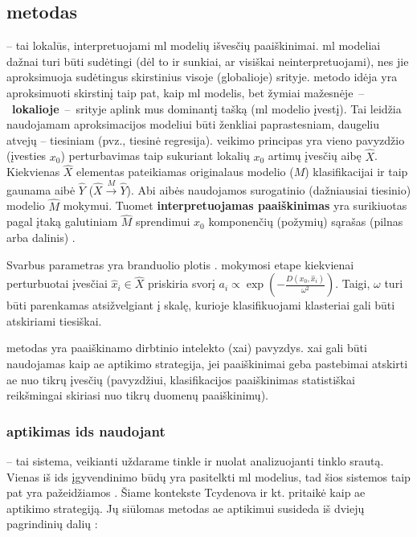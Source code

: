 \subsection{\LIME metodas}\label{sec:literature:lime}

\LIME {} -- tai lokalūs, interpretuojami \gls{ml} modelių išvesčių paaiškinimai. \gls{ml} modeliai dažnai turi būti sudėtingi (dėl to ir sunkiai, ar visiškai neinterpretuojami), nes jie aproksimuoja sudėtingus skirstinius visoje (globalioje) srityje. \LIME metodo idėja yra aproksimuoti skirstinį taip pat, kaip \gls{ml} modelis, bet žymiai mažesnėje~--~\textbf{lokalioje}~--~srityje  aplink mus dominantį tašką (\gls{ml} modelio įvestį). Tai leidžia \LIME naudojamam aproksimacijos modeliui būti ženkliai paprastesniam, daugeliu atvejų -- tiesiniam (pvz., tiesinė regresija).
\LIME veikimo principas yra vieno pavyzdžio (įvesties $x_0$) perturbavimas taip sukuriant lokalių $x_0$ artimų įvesčių aibę $\hat{X}$. Kiekvienas $\hat{X}$ elementas pateikiamas originalaus modelio ($M$) klasifikacijai ir taip gaunama aibė $\hat{Y}$ ($\hat{X} \xrightarrow{M} \hat{Y}$). Abi aibės naudojamos surogatinio (dažniausiai tiesinio) modelio $\hat{M}$ mokymui. Tuomet \textbf{interpretuojamas paaiškinimas} yra surikiuotas pagal įtaką galutiniam $\hat{M}$ sprendimui $x_0$ komponenčių (požymių) sąrašas (pilnas arba dalinis) \cite{ribeiroWhyShouldTrust2016}.

Svarbus \LIME parametras yra branduolio plotis  \omega. \LIME mokymosi etape kiekvienai perturbuotai įvesčiai $\hat{x}_i \in \hat{X}$ priskiria svorį $a_i \propto \exp\left(-\frac{D(x_0, \hat{x}_i)}{\omega^2}\right)$. Taigi, $\omega$ turi būti parenkamas atsižvelgiant į skalę, kurioje klasifikuojami klasteriai gali būti atskiriami tiesiškai.

\LIME metodas yra paaiškinamo dirbtinio intelekto (\gls{xai}) pavyzdys. \gls{xai} gali būti naudojamas kaip \gls{ae} aptikimo strategija, jei paaiškinimai geba pastebimai atskirti \gls{ae} nuo tikrų įvesčių (pavyzdžiui, klasifikacijos paaiškinimas statistiškai reikšmingai skiriasi nuo tikrų duomenų paaiškinimų).

\subsubsection{ aptikimas \gls*{ids} naudojant \LIME}\label{sec:literature:defense:ids}

 -- tai sistema, veikianti uždarame tinkle ir nuolat analizuojanti tinklo srautą. Vienas iš \gls{ids} įgyvendinimo būdų yra pasitelkti \gls{ml} modelius, tad šios sistemos taip pat yra pažeidžiamos . Šiame kontekste Tcydenova ir kt. pritaikė \LIME kaip \gls{ae} aptikimo strategiją. Jų siūlomas metodas  \gls{ae} aptikimui susideda iš dviejų pagrindinių dalių \cite{tcydenovaDetectionAdversarialAttacks2021}:

